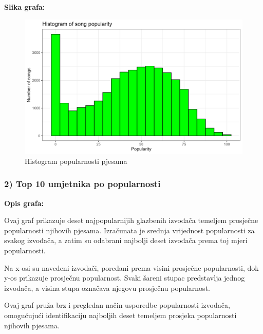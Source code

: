 	\textbf{Slika grafa:}
	\begin{figure}[H]
		\includegraphics[scale=0.9]{slike/Histogram of song popularity.png}
		\centering
		\caption{Histogram popularnosti pjesama}
		
	\end{figure}

	\subsubsection{2) Top 10 umjetnika po popularnosti}
	
	\textbf{Opis grafa:}
	
	Ovaj graf prikazuje deset najpopularnijih glazbenih izvođača temeljem prosječne popularnosti njihovih pjesama. Izračunata je srednja vrijednost popularnosti za svakog izvođača, a zatim su odabrani najbolji deset izvođača prema toj mjeri popularnosti.
	
	Na x-osi su navedeni izvođači, poredani prema visini prosječne popularnosti, dok y-os prikazuje prosječnu popularnost. Svaki šareni stupac predstavlja jednog izvođača, a visina stupa označava njegovu prosječnu popularnost.
	
	Ovaj graf pruža brz i pregledan način usporedbe popularnosti izvođača, omogućujući identifikaciju najboljih deset temeljem prosjeka popularnosti njihovih pjesama.
	

